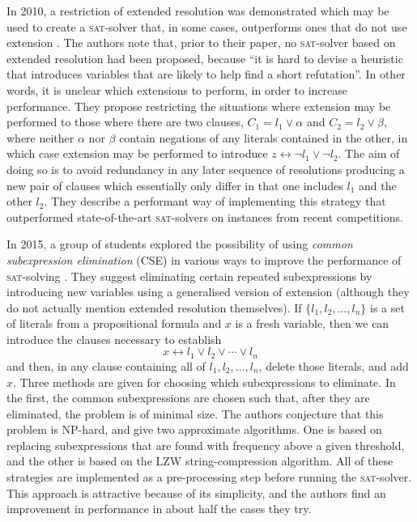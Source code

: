 \documentclass[proof,pdftex,11pt,a4,titlepage]{article}
\newcommand{\sat}{\textsc{sat}}
\begin{document}
In 2010, a restriction of extended resolution was demonstrated which may be used to create a \sat{}-solver that, in some cases, outperforms ones that do not use extension \cite{Audemard:2010}. The authors note that, prior to their paper, no \sat{}-solver based on extended resolution had been proposed, because ``it is hard to devise a heuristic that introduces variables that are likely to help find a short refutation''. In other words, it is unclear which extensions to perform, in order to increase performance. They propose restricting the situations where extension may be performed to those where there are two clauses, $C_1 = l_1 \vee \alpha$ and $C_2 = l_2 \vee \beta$, where neither $\alpha$ nor $\beta$ contain negations of any literals contained in the other, in which case extension may be performed to introduce $z \leftrightarrow \neg l_1 \vee \neg l_2$. The aim of doing so is to avoid redundancy in any later sequence of resolutions producing a new pair of clauses which essentially only differ in that one includes $l_1$ and the other $l_2$. They describe a performant way of implementing this strategy that outperformed state-of-the-art \sat{}-solvers on instances from recent competitions.

In 2015, a group of students explored the possibility of using \emph{common subexpression elimination} (CSE) in various ways to improve the performance of \sat{}-solving \cite{Yan:2015}. They suggest eliminating certain repeated subexpressions by introducing new variables using a generalised version of extension (although they do not actually mention extended resolution themselves). If $\{l_1, l_2, \ldots, l_n\}$ is a set of literals from a propositional formula and $x$ is a fresh variable, then we can introduce the clauses necessary to establish
\[x \leftrightarrow l_1 \vee l_2 \vee \cdots \vee l_n\]
and then, in any clause containing all of $l_1, l_2, \ldots, l_n$, delete those literals, and add $x$. Three methods are given for choosing which subexpressions to eliminate. In the first, the common subexpressions are chosen such that, after they are eliminated, the problem is of minimal size. The authors conjecture that this problem is NP-hard, and give two approximate algorithms. One is based on replacing subexpressions that are found with frequency above a given threshold, and the other is based on the LZW string-compression algorithm. All of these strategies are implemented as a pre-processing step before running the \sat{}-solver. This approach is attractive because of its simplicity, and the authors find an improvement in performance in about half the cases they try.
\end{document}
